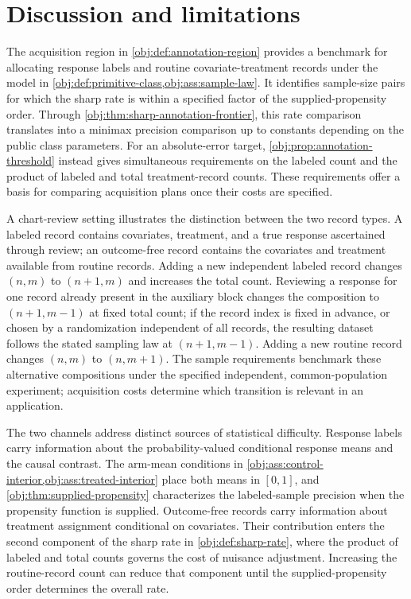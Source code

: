 \documentclass[11pt]{article}
\begin{document}
\section{Discussion and limitations}\label{sec:discussion}

The acquisition region in \cref{obj:def:annotation-region} provides a benchmark for allocating response labels and routine covariate-treatment records under the model in \cref{obj:def:primitive-class,obj:ass:sample-law}. It identifies sample-size pairs for which the sharp rate is within a specified factor of the supplied-propensity order. Through \cref{obj:thm:sharp-annotation-frontier}, this rate comparison translates into a minimax precision comparison up to constants depending on the public class parameters. For an absolute-error target, \cref{obj:prop:annotation-threshold} instead gives simultaneous requirements on the labeled count and the product of labeled and total treatment-record counts. These requirements offer a basis for comparing acquisition plans once their costs are specified.

A chart-review setting illustrates the distinction between the two record types. A labeled record contains covariates, treatment, and a true response ascertained through review; an outcome-free record contains the covariates and treatment available from routine records. Adding a new independent labeled record changes \((n,m)\) to \((n+1,m)\) and increases the total count. Reviewing a response for one record already present in the auxiliary block changes the composition to \((n+1,m-1)\) at fixed total count; if the record index is fixed in advance, or chosen by a randomization independent of all records, the resulting dataset follows the stated sampling law at \((n+1,m-1)\). Adding a new routine record changes \((n,m)\) to \((n,m+1)\). The sample requirements benchmark these alternative compositions under the specified independent, common-population experiment; acquisition costs determine which transition is relevant in an application.

The two channels address distinct sources of statistical difficulty. Response labels carry information about the probability-valued conditional response means and the causal contrast. The arm-mean conditions in \cref{obj:ass:control-interior,obj:ass:treated-interior} place both means in \([0,1]\), and \cref{obj:thm:supplied-propensity} characterizes the labeled-sample precision when the propensity function is supplied. Outcome-free records carry information about treatment assignment conditional on covariates. Their contribution enters the second component of the sharp rate in \cref{obj:def:sharp-rate}, where the product of labeled and total counts governs the cost of nuisance adjustment. Increasing the routine-record count can reduce that component until the supplied-propensity order determines the overall rate.
\end{document}
